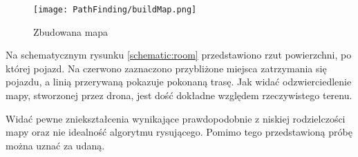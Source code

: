            \begin{figure}[!ht]
                \centering
                \texttt{[image: PathFinding/buildMap.png]}
                \caption{Zbudowana mapa}
                \label{fig:buildMap}
            \end{figure}

            

            Na schematycznym rysunku \ref{schematic:room} przedstawiono rzut powierzchni, po której pojazd.
            Na czerwono zaznaczono przybliżone miejsca zatrzymania się pojazdu, a linią przerywaną pokazuje pokonaną trasę.
            Jak widać odzwierciedlenie mapy, stworzonej przez drona, jest dość dokładne względem rzeczywistego terenu.

            Widać pewne zniekształcenia wynikające prawdopodobnie z niskiej rodzielczości mapy oraz nie idealność algorytmu rysującego.
            Pomimo tego przedstawioną próbę można uznać za udaną.